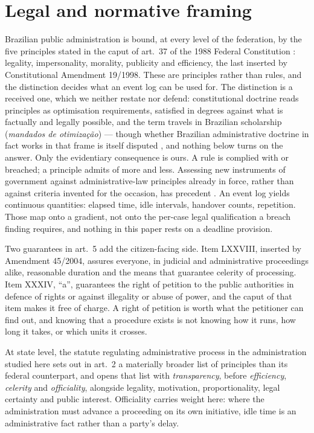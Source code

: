 \section{Legal and normative framing}\label{sec:legal}

Brazilian public administration is bound, at every level of the federation, by the five
principles stated in the caput of art.~37 of the 1988 Federal Constitution \citep{brasil1988cf}: legality,
impersonality, morality, publicity and efficiency, the last inserted by Constitutional
Amendment 19/1998.
These are principles rather than rules, and the distinction decides what an event log can be
used for. The distinction is a received one, which we neither restate nor defend: constitutional
doctrine reads principles as optimisation requirements, satisfied in degrees against what is
factually and legally possible, and the term travels in Brazilian scholarship
(\emph{mandados de otimiza\c{c}\~ao}) --- though whether Brazilian administrative doctrine
in fact works in that frame is itself disputed \citep{brgabardo2017eficiencia}, and nothing
below turns on the answer. Only the evidentiary consequence is ours. A rule is
complied with or breached; a principle admits of more and less. Assessing new
instruments of government against administrative-law principles already in force, rather than
against criteria invented for the occasion, has precedent \citep{oswald2018algorithm}. An event
log yields continuous quantities: elapsed
time, idle intervals, handover counts, repetition. Those map onto a gradient, not onto the
per-case legal qualification a breach finding requires, and nothing in this paper rests on a
deadline provision.

Two guarantees in art.~5 add the citizen-facing side. Item LXXVIII, inserted by Amendment
45/2004, assures everyone, in judicial and administrative proceedings alike, reasonable
duration and the means that guarantee celerity of processing. Item XXXIV, ``a'', guarantees
the right of petition to the public authorities in defence of rights or against illegality
or abuse of power, and the caput of that item makes it free of charge. A right of petition
is worth what the petitioner can find out, and knowing that a procedure exists is not
knowing how it runs, how long it takes, or which units it crosses.

At state level, the statute regulating administrative process in the administration studied
here \citep{state2016procedurelaw} sets out in art.~2 a materially broader list of principles
than its federal counterpart, and opens that list with \emph{transparency}, before
\emph{efficiency}, \emph{celerity} and \emph{officiality}, alongside legality, motivation,
proportionality, legal certainty and public interest.
Officiality carries weight here: where the administration must advance a proceeding on its
own initiative, idle time is an administrative fact rather than a party's delay.

